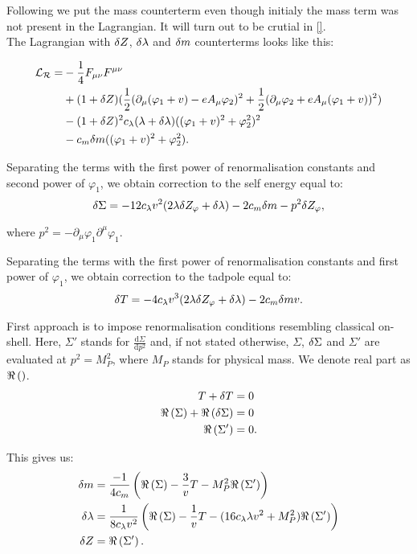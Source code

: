 Following \cite{Coleman1973} we put the mass counterterm even though initialy the mass term 
was not present in the Lagrangian. It will turn out to be crutial in \ref{}. \\ 
The Lagrangian with $\delta Z$, $\delta\lambda$ and $\delta m$ counterterms looks like this:

\begin{align}
\mathcal{L_R} = &-\frac{1}{4}F_{\mu\nu}F^{\mu\nu} \\
&+(1+ \delta Z)(\frac{1}{2}(\partial_\mu(\varphi_1+v) - eA_\mu\varphi_2)^2
+\frac{1}{2}(\partial_\mu\varphi_2+eA_\mu(\varphi_1+v))^2) \notag \\
&-(1+\delta Z)^2c_\lambda(\lambda+\delta\lambda)((\varphi_1+v)^2+\varphi_2^2)^2  \notag \\
&-c_m\delta m((\varphi_1+v)^2+\varphi_2^2).
\end{align}


Separating the terms with the first power of renormalisation constants and second power of 
$\varphi_1$, we obtain correction to the self energy equal to:
\begin{equation}
\delta\Sigma=-12c_\lambda v^2(2\lambda\delta Z_\varphi+\delta\lambda)-2c_m\delta m-p^2\delta Z_\varphi,
\end{equation}

where $p^2 = -\partial_\mu \varphi_1\partial^\mu\varphi_1$.


Separating the terms with the first power of renormalisation constants and first power of 
$\varphi_1$, we obtain correction to the tadpole equal to:
\begin{equation}
\delta T=-4c_\lambda v^3(2\lambda\delta Z_\varphi+\delta\lambda)-2c_m\delta m v.
\end{equation}



First approach is to impose renormalisation conditions resembling classical on-shell.
Here, $\Sigma'$ stands for $\frac{\textrm{d}\Sigma}{\textrm{d}p^2}$ and, if not 
stated otherwise, 
$\Sigma$, $\delta\Sigma$ and $\Sigma'$ are evaluated at $p^2 = M_P^2$, where 
$M_P$ stands for physical mass. We denote real part as $\Re\left(\right)$.
\begin{align}
T+\delta T &= 0 \\
\Re\left(\Sigma\right) + \Re\left(\delta\Sigma\right) &= 0 \\
\Re\left(\Sigma'\right) &= 0.
\end{align}

This gives us:
\begin{align}
\delta m &= \frac{-1}{4c_m}\left(\Re\left(\Sigma\right)-\frac{3}{v}T-M_P^2\Re\left(\Sigma'\right)
\right)\\
\delta\lambda &= \frac{1}{8c_\lambda v^2}\left(\Re\left(\Sigma\right)-\frac{1}{v}T-(16c_\lambda\lambda v^2+M_P^2)
\Re\left(\Sigma'\right)
\right)\\
\delta Z &= \Re\left(\Sigma'\right).
\end{align}

